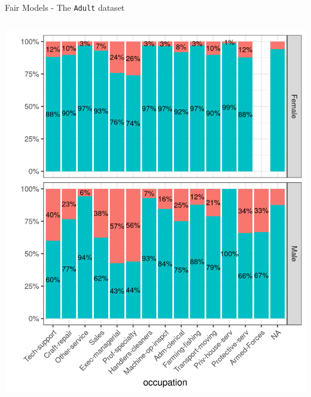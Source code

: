 \begin{frame}{Fair Models - The \texttt{Adult} dataset}
\begin{columns}
\begin{column}{0.6\textwidth}
\includegraphics[scale = 0.45]{images/dataset_adult_education.png}
\end{column}
\end{columns}


\end{frame}

